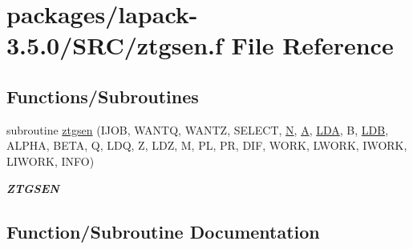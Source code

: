 \hypertarget{ztgsen_8f}{}\section{packages/lapack-\/3.5.0/\+S\+R\+C/ztgsen.f File Reference}
\label{ztgsen_8f}
\subsection*{Functions/\+Subroutines}
\begin{DoxyCompactItemize}
\item 
subroutine \hyperlink{ztgsen_8f_a3095b9c0e4d0432e05ef0e88dbc4ae7c}{ztgsen} (I\+J\+O\+B, W\+A\+N\+T\+Q, W\+A\+N\+T\+Z, S\+E\+L\+E\+C\+T, \hyperlink{polmisc_8c_a0240ac851181b84ac374872dc5434ee4}{N}, \hyperlink{classA}{A}, \hyperlink{example__user_8c_ae946da542ce0db94dced19b2ecefd1aa}{L\+D\+A}, B, \hyperlink{example__user_8c_a50e90a7104df172b5a89a06c47fcca04}{L\+D\+B}, A\+L\+P\+H\+A, B\+E\+T\+A, Q, L\+D\+Q, Z, L\+D\+Z, M, P\+L, P\+R, D\+I\+F, W\+O\+R\+K, L\+W\+O\+R\+K, I\+W\+O\+R\+K, L\+I\+W\+O\+R\+K, I\+N\+F\+O)
\begin{DoxyCompactList}\small\item\em {\bfseries Z\+T\+G\+S\+E\+N} \end{DoxyCompactList}\end{DoxyCompactItemize}


\subsection{Function/\+Subroutine Documentation}
\hypertarget{ztgsen_8f_a3095b9c0e4d0432e05ef0e88dbc4ae7c}{}
